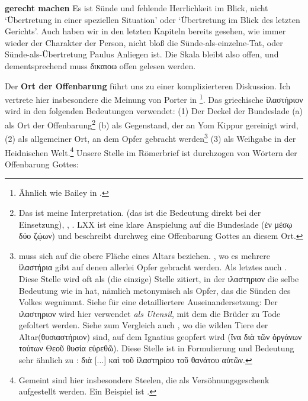 \textbf{gerecht machen} Es ist Sünde und fehlende Herrlichkeit im Blick, nicht `Übertretung in einer speziellen Situation' oder `Übertretung im Blick des letzten Gerichts'.
		Auch haben wir in den letzten Kapiteln bereits gesehen, wie immer wieder der Charakter der Person, nicht bloß die Sünde-als-einzelne-Tat, oder Sünde-als-Übertretung
		Paulus Anliegen ist.
		Die Skala bleibt also offen, und dementsprechend muss δικαιοω offen gelesen werden.

Der \textbf{Ort der Offenbarung} führt uns zu einer komplizierteren Diskussion. Ich vertrete hier insbesondere die Meinung von Porter in \Cite{mercy-seat-revelation}\footnote{
	Ähnlich wie Bailey in \Cite{jesus-as-the-mercy-seat}.
}.
Das griechische ἱλαστήριον wird in den folgenden Bedeutungen verwendet: (1) Der Deckel der Bundeslade (a) als Ort der Offenbarung\footnote{
	Das ist meine Interpretation.  (das ist die Bedeutung direkt bei der Einsetzung),
	, .
	LXX  ist eine klare Anspielung auf die Bundeslade (ἐν μέσῳ δύο ζῴων) und beschreibt durchweg eine Offenbarung Gottes an diesem Ort.
}
(b) als Gegenstand, der an Yom Kippur gereinigt wird,
(2) als allgemeiner Ort, an dem Opfer gebracht werden\footnote{
	\label{fn:hilstareion-in-iv-mac}
	 muss sich auf die obere Fläche eines Altars beziehen.
	, wo es mehrere ἱλαστήρια gibt auf denen allerlei Opfer gebracht werden.
	Als letztes auch .
	Diese Stelle wird oft als (die einzige) Stelle zitiert, in der ιλαστηριον die selbe Bedeutung wie in 
	hat, nämlich metonymisch als Opfer, das die Sünden des Volkes wegnimmt.
	Siehe \Cite{mercy-seat-revelation} für eine detailliertere Auseinandersetzung:
	Der ιλαστηριον wird hier verwendet \textit{als Utensil}, mit dem die Brüder zu Tode gefoltert werden.
	Siehe zum Vergleich auch \Cite[2,4]{ignatius-of-antioch-to-the-romans}, wo die wilden Tiere der Altar(θυσιαστήριον) sind, auf dem Ignatius geopfert wird (ἵνα διὰ τῶν ὀργάνων τούτων Θεοῦ θυσία εὑρεθῶ).
	Diese Stelle ist in Formulierung und Bedeutung sehr ähnlich zu : διὰ [...] καὶ τοῦ ἱλαστηρίου τοῦ θανάτου αὐτῶν.
}
(3) als Weihgabe in der Heidnischen Welt.\footnote{
	Gemeint sind hier insbesondere Steelen, die als Versöhnungsgeschenk aufgestellt werden.
	Ein Beispiel ist \Cite[16.182]{antiquitates}.
}
Unsere Stelle im Römerbrief ist durchzogen von Wörtern der Offenbarung Gottes:

